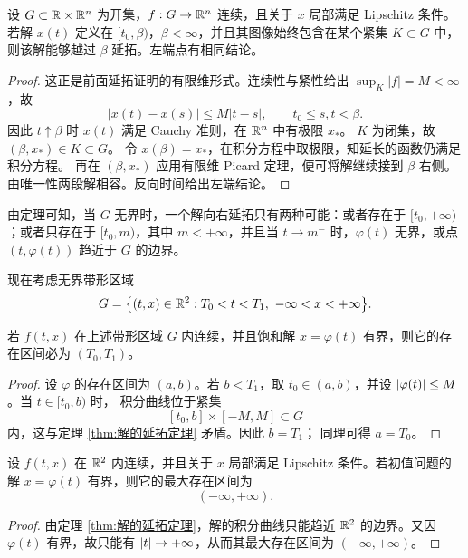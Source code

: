 \begin{proposition}[有限维紧集延拓判据]\label{prop:compact-extension-vector}
设 $G\subset\mathbb{R}\times\mathbb{R}^n$ 为开集，$f:G\to\mathbb{R}^n$ 连续，且关于 $x$ 局部满足 Lipschitz 条件。
若解 $x(t)$ 定义在 $[t_0,\beta)$，$\beta<\infty$，并且其图像始终包含在某个紧集 $K\subset G$ 中，
则该解能够越过 $\beta$ 延拓。左端点有相同结论。
\end{proposition}
\begin{proof}
这正是前面延拓证明的有限维形式。连续性与紧性给出 $\sup_K|f|=M<\infty$，故
\[
 |x(t)-x(s)|\leq M|t-s|,\qquad t_0\leq s,t<\beta.
\]
因此 $t\uparrow\beta$ 时 $x(t)$ 满足 Cauchy 准则，在 $\mathbb{R}^n$ 中有极限 $x_*$。
$K$ 为闭集，故 $(\beta,x_*)\in K\subset G$。
令 $x(\beta)=x_*$，在积分方程中取极限，知延长的函数仍满足积分方程。
再在 $(\beta,x_*)$ 应用有限维 Picard 定理，便可将解继续接到 $\beta$ 右侧。
由唯一性两段解相容。反向时间给出左端结论。
\end{proof}

由定理可知，当 $G$ 无界时，一个解向右延拓只有两种可能：或者存在于
$[t_0,+\infty)$；或者只存在于 $[t_0,m)$，其中 $m<+\infty$，并且当
$t\to m^-$ 时，$\varphi(t)$ 无界，或点
$(t,\varphi(t))$ 趋近于 $G$ 的边界。

现在考虑无界带形区域
\[
	G=\bigl\{(t,x)\in\R^2:T_0<t<T_1,\ -\infty<x<+\infty\bigr\}.
\]

\begin{corollary}\label{cor:有界饱和解的全区间存在性}
	若 $f(t,x)$ 在上述带形区域 $G$ 内连续，并且饱和解
	$x=\varphi(t)$ 有界，则它的存在区间必为 $(T_0,T_1)$。
\end{corollary}

\begin{proof}
	设 $\varphi$ 的存在区间为 $(a,b)$。若 $b<T_1$，取
	$t_0\in(a,b)$，并设 $\left| \varphi(t) \right|\leq M$。当 $t\in[t_0,b)$ 时，
	积分曲线位于紧集
	\[
		[t_0,b]\times[-M,M]\subset G
	\]
	内，这与定理 \ref{thm:解的延拓定理} 矛盾。因此 $b=T_1$；
	同理可得 $a=T_0$。
\end{proof}

\begin{corollary}[全空间中有界解的全局存在性]
	\label{cor:全空间中有界解的全局存在性}
	设 $f(t,x)$ 在 $\mathbb{R}^2$ 内连续，并且关于 $x$ 局部满足 Lipschitz
	条件。若初值问题的解 $x=\varphi(t)$ 有界，则它的最大存在区间为
	\[
		(-\infty,+\infty).
	\]
\end{corollary}

\begin{proof}
	由定理 \ref{thm:解的延拓定理}，解的积分曲线只能趋近
	$\mathbb{R}^2$ 的边界。又因 $\varphi(t)$ 有界，故只能有
	$\left| t \right|\to+\infty$，从而其最大存在区间为
	$(-\infty,+\infty)$。
\end{proof}

